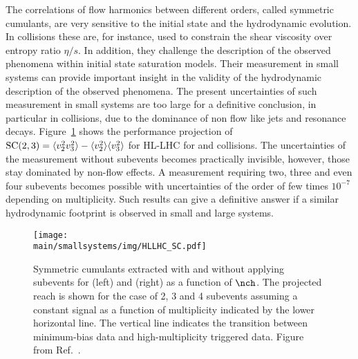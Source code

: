 \documentclass[../report.tex]{subfiles}
\providecommand{\main}{..}
\begin{document}

The correlations of flow harmonics between different orders, called symmetric cumulants, are very sensitive to the initial state and the hydrodynamic evolution. In \PbPb collisions these are, for instance, used to constrain the shear viscosity over entropy ratio $\eta/s$. In addition, they challenge the description of the observed phenomena within initial state saturation models.
Their measurement in small systems can provide important insight in the validity of the hydrodynamic description of the observed phenomena. The present uncertainties of such measurement in small systems are too large for a definitive conclusion, in particular in \pp collisions, due to the dominance of non flow like jets and resonance decays. Figure~\ref{fig:smallsystems_corr_symmetriccumulants} shows the performance projection of ${\rm SC}(2,3) = \langle v_2^2 v_3^2 \rangle - \langle v_2^2 \rangle \langle v_3^2 \rangle$ for HL-LHC for \pp and \pPb collisions. The uncertainties of the measurement without subevents becomes practically invisible, however, those stay dominated by non-flow effects. A measurement requiring two, three and even four subevents becomes possible with uncertainties of the order of few times $10^{-7}$ depending on multiplicity. Such results can give a definitive answer if a similar hydrodynamic footprint is observed in small and large systems.

\begin{figure}[t]
\centering
\texttt{[image: \\main/smallsystems/img/HLLHC\_SC.pdf]}
\caption{Symmetric cumulants extracted with and without applying subevents for \pp (left) and \pPb (right) as a function of $\nch$. The projected reach is shown for the case of 2, 3 and 4 subevents assuming a constant signal as a function of multiplicity indicated by the lower horizontal line. The vertical line indicates the transition between minimum-bias data and high-multiplicity triggered data. Figure from Ref.~\cite{}.}
\label{fig:smallsystems_corr_symmetriccumulants}
\end{figure}
\end{document}
